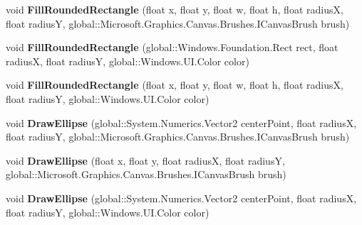 \begin{DoxyCompactItemize}
void {\bfseries Fill\+Rounded\+Rectangle} (float x, float y, float w, float h, float radiusX, float radiusY, global\+::\+Microsoft.\+Graphics.\+Canvas.\+Brushes.\+I\+Canvas\+Brush brush)
\item 
\mbox{\label{interface_microsoft_1_1_graphics_1_1_canvas_1_1_i_canvas_drawing_session_a2754a176d8e8d77579ccd174b869714d}} 
void {\bfseries Fill\+Rounded\+Rectangle} (global\+::\+Windows.\+Foundation.\+Rect rect, float radiusX, float radiusY, global\+::\+Windows.\+U\+I.\+Color color)
\item 
\mbox{\label{interface_microsoft_1_1_graphics_1_1_canvas_1_1_i_canvas_drawing_session_a0458a52d06f9947b206195167ddcfc73}} 
void {\bfseries Fill\+Rounded\+Rectangle} (float x, float y, float w, float h, float radiusX, float radiusY, global\+::\+Windows.\+U\+I.\+Color color)
\item 
\mbox{\label{interface_microsoft_1_1_graphics_1_1_canvas_1_1_i_canvas_drawing_session_a8d23860e99bbdc73d66a986215651b87}} 
void {\bfseries Draw\+Ellipse} (global\+::\+System.\+Numerics.\+Vector2 center\+Point, float radiusX, float radiusY, global\+::\+Microsoft.\+Graphics.\+Canvas.\+Brushes.\+I\+Canvas\+Brush brush)
\item 
\mbox{\label{interface_microsoft_1_1_graphics_1_1_canvas_1_1_i_canvas_drawing_session_ad948689f5f475e1265bfd6bd1b6d31f9}} 
void {\bfseries Draw\+Ellipse} (float x, float y, float radiusX, float radiusY, global\+::\+Microsoft.\+Graphics.\+Canvas.\+Brushes.\+I\+Canvas\+Brush brush)
\item 
\mbox{\label{interface_microsoft_1_1_graphics_1_1_canvas_1_1_i_canvas_drawing_session_afc25b02c2240132004eb075a6f12006a}} 
void {\bfseries Draw\+Ellipse} (global\+::\+System.\+Numerics.\+Vector2 center\+Point, float radiusX, float radiusY, global\+::\+Windows.\+U\+I.\+Color color)
\item 
\mbox{\label{interface_microsoft_1_1_graphics_1_1_canvas_1_1_i_canvas_drawing_session_a6cdb8e5f737e4475a85335ee9d17d397}} 

\end{DoxyCompactItemize}
